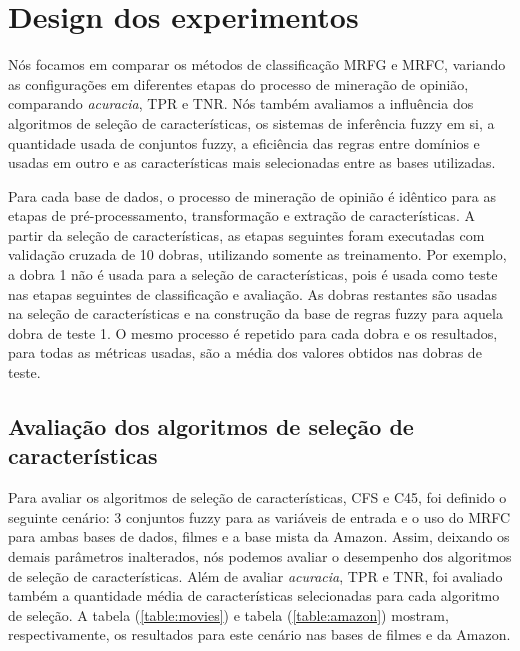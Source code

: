 \section{Design dos experimentos}

Nós focamos em comparar os métodos de classificação MRFG e MRFC, variando as configurações em diferentes etapas do processo de mineração de opinião, comparando \textit{acuracia}, TPR e TNR. Nós também avaliamos a influência dos algoritmos de seleção de características, os sistemas de inferência fuzzy em si, a quantidade usada de conjuntos fuzzy, a eficiência das regras entre domínios e usadas em outro e as características mais selecionadas entre as bases utilizadas. 

Para cada base de dados, o processo de mineração de opinião é idêntico para as etapas de pré-processamento, transformação e extração de características. A partir da seleção de características, as etapas seguintes foram executadas com validação cruzada de 10 dobras, utilizando somente as treinamento. Por exemplo, a dobra 1 não é usada para a seleção de características, pois é usada como teste nas etapas seguintes de classificação e avaliação. As dobras restantes são usadas na seleção de características e na construção da base de regras fuzzy para aquela dobra de teste 1. O mesmo processo é repetido para cada dobra e os resultados, para todas as métricas usadas, são a média dos valores obtidos nas dobras de teste. 

\subsection{Avaliação dos algoritmos de seleção de características}

Para avaliar os algoritmos de seleção de características, CFS e C45, foi definido o seguinte cenário: 3 conjuntos fuzzy para as variáveis de entrada e o uso do MRFC para ambas bases de dados, filmes e a base mista da Amazon. Assim, deixando os demais parâmetros inalterados, nós podemos avaliar o desempenho dos algoritmos de seleção de características. Além de avaliar \textit{acuracia}, TPR e TNR, foi avaliado também a quantidade média de características selecionadas para cada algoritmo de seleção. A tabela (\ref{table:movies}) e tabela (\ref{table:amazon}) mostram, respectivamente, os resultados para este cenário nas bases de filmes e da Amazon. 

